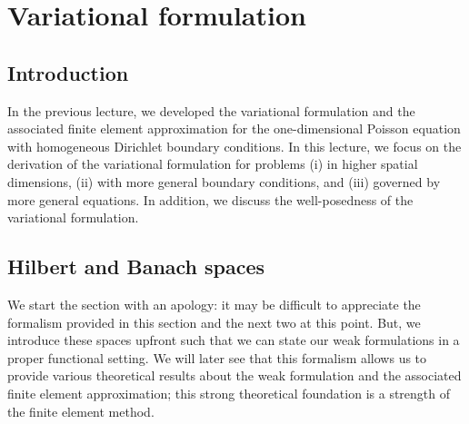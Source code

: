 \chapter{Variational formulation}
\label{ch:var_form}
\disclaimer

\section{Introduction}
In the previous lecture, we developed the variational formulation and the associated finite element approximation for the one-dimensional Poisson equation with homogeneous Dirichlet boundary conditions. In this lecture, we focus on the derivation of the variational formulation for problems (i) in higher spatial dimensions, (ii) with more general boundary conditions, and (iii) governed by more general equations.  In addition, we discuss the well-posedness of the variational formulation.

\section{Hilbert and Banach spaces}
We start the section with an apology: it may be difficult to appreciate the formalism provided in this section and the next two at this point.  But, we introduce these spaces upfront such that we can state our weak formulations in a proper functional setting.  We will later see that this formalism allows us to provide various theoretical results about the weak formulation and the associated finite element approximation; this strong theoretical foundation is a strength of the finite element method. 


